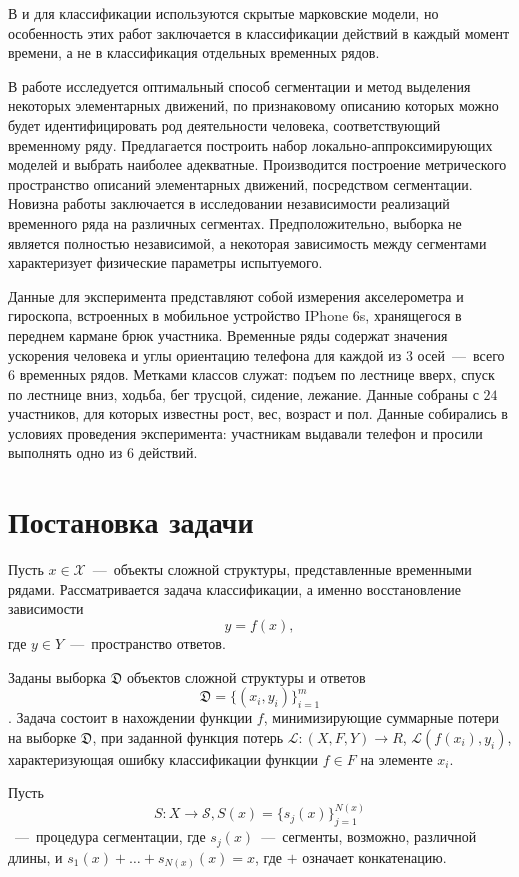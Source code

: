 \documentclass[12pt, twoside]{article}
\begin{document}
В \cite{Dafne19} и \cite{Sabatini10} для классификации используются скрытые марковские модели, но особенность этих работ заключается в классификации действий в каждый момент времени, а не в классификация отдельных временных рядов.

В работе исследуется оптимальный способ сегментации и метод выделения некоторых элементарных движений, по признаковому описанию которых можно будет идентифицировать род деятельности человека, соответствующий временному ряду. Предлагается построить набор локально-аппроксимирующих моделей и выбрать наиболее адекватные. Производится построение метрического пространство описаний элементарных движений, посредством сегментации. Новизна работы заключается в исследовании независимости реализаций временного ряда на различных сегментах. Предположительно, выборка не является полностью независимой, а некоторая зависимость между сегментами характеризует физические параметры испытуемого. 

Данные для эксперимента представляют собой измерения акселерометра и гироскопа, встроенных в мобильное устройство IPhone 6s, хранящегося в переднем кармане брюк участника. Временные ряды содержат значения ускорения человека и углы ориентацию телефона для каждой из $3$ осей~---~всего $6$ временных рядов. Метками классов служат: подъем по лестнице вверх, спуск по лестнице вниз, ходьба, бег трусцой, сидение, лежание. Данные собраны с $24$ участников, для которых известны рост, вес, возраст и пол. Данные собирались в условиях проведения эксперимента: участникам выдавали телефон и просили выполнять одно из $6$ действий.

\section{Постановка задачи}

Пусть $x\in \mathcal{X}$~---~объекты сложной структуры, представленные временными рядами. Рассматривается задача классификации, а именно восстановление зависимости $$y=f(x),$$ где $y\in Y$~---~пространство ответов. 

Заданы выборка $\mathfrak{D}$ объектов сложной структуры и ответов $$\mathfrak{D}=\{(x_i,y_i)\}_{i=1}^m$$. Задача состоит в нахождении функции $f$, минимизирующие суммарные потери на выборке $\mathfrak{D}$, при заданной функция потерь $\mathscr{L}:(X,F,Y)\rightarrow R$, $\mathscr{L}(f(x_i),y_i)$, характеризующая ошибку классификации функции $f\in F$ на элементе $x_i$.

Пусть $$S:X\rightarrow \mathcal{S}, S(x)=\{s_j(x)\}_{j=1}^{N(x)}$$~---~процедура сегментации, где $s_j(x)$~---~сегменты, возможно, различной длины, и $s_1(x)+\ldots+s_{N(x)}(x)=x$, где $+$ означает конкатенацию.
\end{document}
